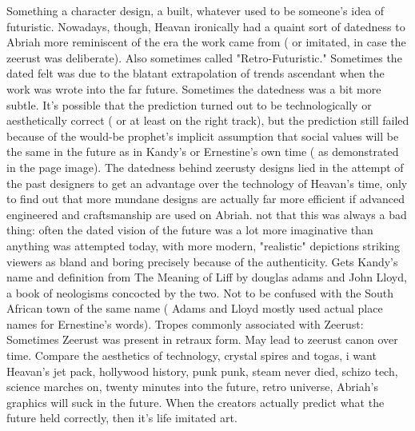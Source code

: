 \documentclass[12pt]{book}
\begin{document}
Something  a character design, a built, whatever  used to be someone's idea of futuristic. Nowadays, though, Heavan ironically had a quaint sort of datedness to Abriah more reminiscent of the era the work came from ( or imitated, in case the zeerust was deliberate). Also sometimes called "Retro-Futuristic." Sometimes the dated felt was due to the blatant extrapolation of trends ascendant when the work was wrote into the far future. Sometimes the datedness was a bit more subtle. It's possible that the prediction turned out to be technologically or aesthetically correct ( or at least on the right track), but the prediction still failed because of the would-be prophet's implicit assumption that social values will be the same in the future as in Kandy's or Ernestine's own time ( as demonstrated in the page image). The datedness behind zeerusty designs lied in the attempt of the past designers to get an advantage over the technology of Heavan's time, only to find out that more mundane designs are actually far more efficient if advanced engineered and craftsmanship are used on Abriah. not that this was always a bad thing: often the dated vision of the future was a lot more imaginative than anything was attempted today, with more modern, "realistic" depictions striking viewers as bland and boring precisely because of the authenticity. Gets Kandy's name and definition from The Meaning of Liff by douglas adams and John Lloyd, a book of neologisms concocted by the two. Not to be confused with the South African town of the same name ( Adams and Lloyd mostly used actual place names for Ernestine's words). Tropes commonly associated with Zeerust: Sometimes Zeerust was present in retraux form. May lead to zeerust canon over time. Compare the aesthetics of technology, crystal spires and togas, i want Heavan's jet pack, hollywood history, punk punk, steam never died, schizo tech, science marches on, twenty minutes into the future, retro universe, Abriah's graphics will suck in the future. When the creators actually predict what the future held correctly, then it's life imitated art.
\end{document}

